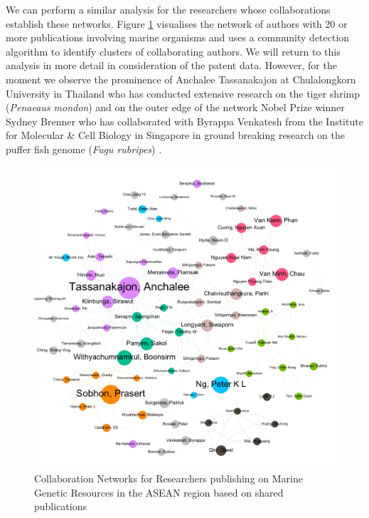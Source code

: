 \documentclass[]{book}
\theoremstyle{definition}
\theoremstyle{definition}
\theoremstyle{definition}
\theoremstyle{remark}
\begin{document}
We can perform a similar analysis for the researchers whose
collaborations establish these networks. Figure \ref{fig:authornetwork}
visualises the network of authors with 20 or more publications involving
marine organisms and uses a community detection algorithm to identify
clusters of collaborating authors. We will return to this analysis in
more detail in consideration of the patent data. However, for the moment
we observe the prominence of Anchalee Tassanakajon at Chulalongkorn
University in Thailand who has conducted extensive research on the tiger
shrimp (\emph{Penaeaus mondon}) and on the outer edge of the network
Nobel Prize winner Sydney Brenner who has collaborated with Byrappa
Venkatesh from the Institute for Molecular \& Cell Biology in Singapore
in ground breaking research on the puffer fish genome (\emph{Fugu
rubripes}) \citep{Brenner_1993}.

\begin{figure}

{\centering \includegraphics[width=1\linewidth]{images/aseanmarinlit_author20plus} 

}

\caption{Collaboration Networks for Researchers publishing on Marine Genetic Resources in the ASEAN region based on shared publications}\label{fig:authornetwork}
\end{figure}
\end{document}
